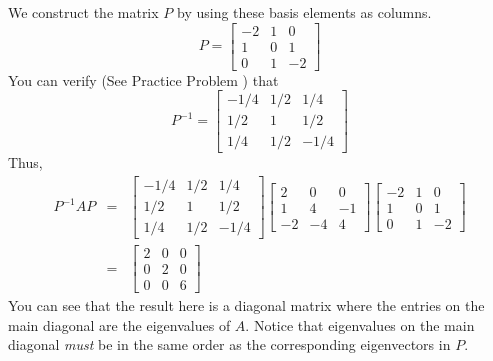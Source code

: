 \documentclass{ximera}
\begin{document}
\begin{example}
\begin{explanation}
We construct the matrix $P$ by using these basis elements as columns.
\begin{equation*}
P=\begin{bmatrix}
-2 & 1 & 0 \\
1 & 0 & 1 \\
0 & 1 & -2
\end{bmatrix}
\end{equation*}
You can verify (See Practice Problem ) that
\begin{equation*}
P^{-1}=\begin{bmatrix}
-1/4 & 1/2 & 1/4 \\
1/2 & 1 & 1/2 \\
1/4 & 1/2 & -1/4
\end{bmatrix}
\end{equation*}
Thus,
\begin{eqnarray*}
P^{-1}AP &=&\begin{bmatrix}
-1/4 & 1/2 & 1/4 \\
1/2 & 1 & 1/2 \\
1/4 & 1/2 & -1/4
\end{bmatrix} \begin{bmatrix}
2 & 0 & 0 \\
1 & 4 & -1 \\
-2 & -4 & 4
\end{bmatrix} \begin{bmatrix}
-2 & 1 & 0 \\
1 & 0 & 1 \\
0 & 1 & -2
\end{bmatrix} \\
&=&\begin{bmatrix}
2 & 0 & 0 \\
0 & 2 & 0 \\
0 & 0 & 6
\end{bmatrix}
\end{eqnarray*}
You can see that the result here is a diagonal matrix where the entries on the main diagonal are the eigenvalues of $A$. Notice that eigenvalues on the main diagonal {\it must} be in the same order as the corresponding eigenvectors in $P$.
\end{explanation}
\end{example}

\end{document}
